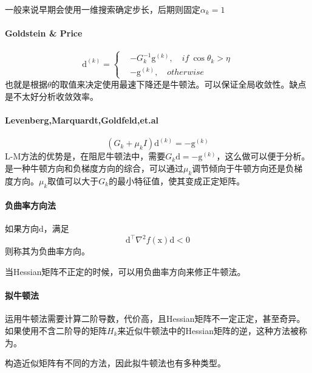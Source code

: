 \documentclass[a4paper]{D:/repositories/MyDGP/latex/PaperReadingLog}
\begin{document}
一般来说早期会使用一维搜索确定步长，后期则固定$\alpha_k=1$

\paragraph{Goldstein \& Price}
$$
\mathrm{d}^{(k)}=\left\{
\begin{aligned}
    &-G_k^{-1}\mathrm{g}^{(k)},\quad if\ \cos\theta_k>\eta\\
    &-\mathrm{g}^{(k)},\quad otherwise
\end{aligned}
\right.
$$
也就是根据$\theta$的取值来决定使用最速下降还是牛顿法。可以保证全局收敛性。缺点是不太好分析收敛效率。

\paragraph{Levenberg,Marquardt,Goldfeld,et.al}
$$
(G_k+\mu_kI)\mathrm{d}^{(k)}=-\mathrm{g}^{(k)}
$$
L-M方法的优势是，在阻尼牛顿法中，需要$G_k\mathrm{d}=-\mathrm{g}^{(k)}$，这么做可以便于分析。是一种牛顿方向和负梯度方向的综合，可以通过$\mu_k$调节倾向于牛顿方向还是负梯度方向。$\mu_k$取值可以大于$G_k$的最小特征值，使其变成正定矩阵。

\paragraph{负曲率方向法}
如果方向$\mathrm{d}$，满足
$$
\mathrm{d}^\top\nabla^2f(\mathrm{x})\mathrm{d}<0
$$
则称其为负曲率方向。

当Hessian矩阵不正定的时候，可以用负曲率方向来修正牛顿法。

\paragraph{拟牛顿法}
运用牛顿法需要计算二阶导数，代价高，且Hessian矩阵不一定正定，甚至奇异。如果使用不含二阶导的矩阵$H_k$来近似牛顿法中的Hessian矩阵的逆，这种方法被称为。

构造近似矩阵有不同的方法，因此拟牛顿法也有多种类型。
\end{document}
